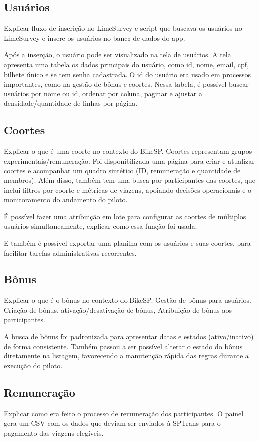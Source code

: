\subsection{Usuários}
Explicar fluxo de inscrição no LimeSurvey e script que buscava os usuários no
LimeSurvey e insere os usuários no banco de dados do app.

Após a inserção, o usuário pode ser visualizado na tela de usuários.
A tela apresenta uma tabela os dados principais do usuário, como id, nome, email,
cpf, bilhete único e se tem senha cadastrada.
O id do usuário era usado em processos importantes, como na gestão de bônus e coortes.
Nessa tabela, é possível buscar usuários por nome ou id, ordenar por coluna,
paginar e ajustar a densidade/quantidade de linhas por página.


\subsection{Coortes}
Explicar o que é uma coorte no contexto do BikeSP.
Coortes representam grupos experimentais/remuneração. Foi disponibilizada uma
página para criar e atualizar coortes e acompanhar um quadro sintético (ID,
remuneração e quantidade de membros). Além disso, também tem uma busca por participantes
das coortes, que inclui filtros por coorte e métricas de viagens, apoiando decisões
operacionais e o monitoramento do andamento do piloto.

É possível fazer uma atribuição em lote para configurar as coortes de múltiplos usuários
simultaneamente, explicar como essa função foi usada.

E também é possível exportar uma planilha com os usuários e suas coortes,
para facilitar tarefas administrativas recorrentes.


\subsection{Bônus}
Explicar o que é o bônus no contexto do BikeSP.
Gestão de bônus para usuários. Criação de bônus, ativação/desativação de bônus,
Atribuição de bônus aos participantes. 

A busca de bônus foi padronizada para apresentar datas e estados (ativo/inativo)
de forma consistente. Também passou a ser possível alterar o estado do bônus
diretamente na listagem, favorecendo a manutenção rápida das regras durante a
execução do piloto.


\subsection{Remuneração}
Explicar como era feito o processo de remuneração dos participantes.
O painel gera um CSV com os dados que deviam ser enviados à SPTrans para o pagamento
das viagens elegíveis.

